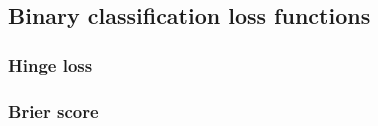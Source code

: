 
\subsection{Binary classification loss functions}

\subsubsection{Hinge loss}

\subsubsection{Brier score}

